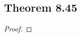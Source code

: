 \documentclass[../../main.tex]{subfiles}
\begin{document}
\subsection{Theorem 8.45}
\begin{wts}

\end{wts}
\begin{proof}

\end{proof}
\end{document}
